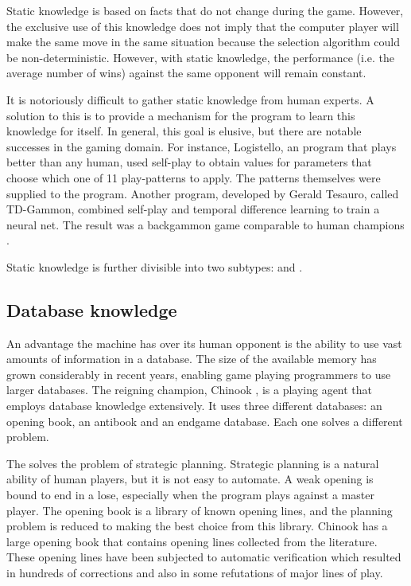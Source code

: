 Static knowledge  is based on facts that do not change during the game.  However, the exclusive use of this knowledge does not imply that the computer player will make the same move in the same situation because the selection algorithm  could be non-deterministic.  However, with static knowledge, the performance (i.e. the average number of wins) against the same opponent will remain constant.  


It is notoriously difficult to gather static knowledge from human experts.  A solution to this  is to provide a mechanism for the program to learn this knowledge for itself.  In general, this goal is elusive, but there are notable successes in the gaming domain. For instance,  Logistello, an  program that plays better than any human, used self-play to obtain values for parameters that choose which one of 11 play-patterns to apply.  The patterns themselves were supplied to the program. Another program, developed by Gerald Tesauro, called TD-Gammon, combined self-play and temporal difference learning to train a neural net.  The result was a backgammon game comparable to human champions \cite{tesauro:learning}.

Static knowledge is further divisible into two subtypes: \newline {} and .  

\subsection{Database knowledge}
An advantage the machine has over its human opponent is the ability to use vast amounts of information in a database.   The size of the available memory has grown considerably in recent years, enabling game playing programmers to use larger databases.   
The reigning  champion, Chinook \cite{schaeffer:solving}, is a playing agent that employs database knowledge extensively.  It uses three different databases: an opening book, an antibook and an endgame database.  Each one solves a different problem.

The  solves the problem of  strategic planning.  Strategic planning is a natural ability of human players, but it is not easy to automate.  A weak opening is bound to end in a lose, especially when the program plays against a master player. The opening book  is a library of known opening lines, and the planning problem is reduced to making the best choice from this library.  Chinook has a large opening book that  contains opening lines collected from the  literature.  These opening lines have been subjected to automatic verification which resulted in hundreds of corrections and also in some refutations of major lines of play.   

